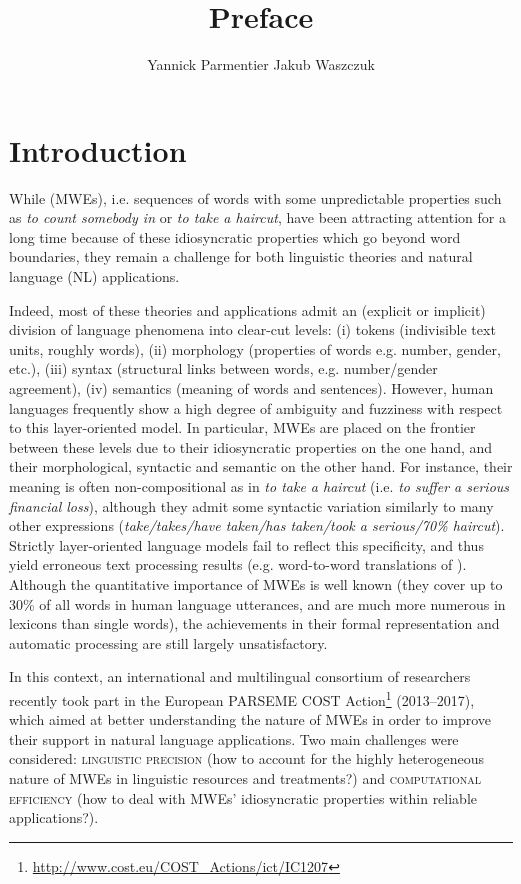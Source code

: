 \documentclass[output=paper]{langsci/langscibook}
\title{Preface}
\author{%
 Yannick Parmentier\affiliation{University of Orléans\\University of Lorraine}\lastand 
 Jakub Waszczuk\affiliation{University of Tours\\University of D\"usseldorf}
}
\begin{document}
\section{Introduction} 
While  (MWEs), i.e. sequences of words with some
unpredictable properties such as \textit{to count somebody in} or
\textit{to take a haircut}, have been attracting attention for a long
time because of these idiosyncratic properties which go beyond word
boundaries, they remain a challenge for both linguistic theories and
natural language (NL) applications.

Indeed, most of these theories and applications admit an (explicit or
implicit) division of language phenomena into clear-cut levels:
(i) tokens (indivisible text units, roughly words),
(ii) morphology (properties of words e.g. number, gender, etc.),
(iii) syntax (structural links between words, e.g. number/gender agreement),
(iv) semantics (meaning of words and sentences).
However, human languages frequently show a high degree of ambiguity
and fuzziness with respect to this layer-oriented model. In
particular, MWEs are placed on the frontier between these levels due
to their idiosyncratic properties on the one hand, and their
morphological, syntactic and semantic  on the other
hand. For instance, their meaning is often non-compositional as in \textit{to
take a haircut} (i.e. \textit{to suffer a serious financial loss}), although
they admit some syntactic variation similarly to many other
expressions (\textit{take/takes/have taken/has taken/took a serious/70\%
haircut}). Strictly layer-oriented language models fail to reflect
this specificity, and thus yield erroneous text processing results
(e.g. word-to-word translations of ). Although the quantitative
importance of MWEs is well known (they cover up to 30\% of all words
in human language utterances, and are much more numerous in lexicons
than single words), the achievements in their formal representation
and automatic processing are still largely unsatisfactory.

In this context, an international and multilingual consortium of
researchers recently took part in the European PARSEME COST
Action\footnote{\url{http://www.cost.eu/COST_Actions/ict/IC1207}}
(2013--2017), which aimed at better understanding the nature of MWEs in
order to improve their support in natural language applications. Two
main challenges were considered: \textsc{linguistic precision} (how to
account for the highly heterogeneous nature of MWEs in linguistic
resources and treatments?) and \textsc{computational efficiency} (how to
deal with MWEs' idiosyncratic properties within reliable applications?).
\end{document}
